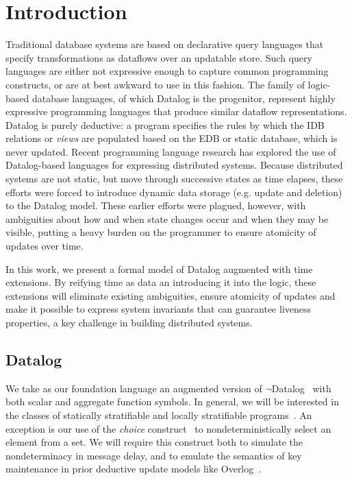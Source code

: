 \section{Introduction}

Traditional database systems are based on declarative query languages that specify transformations as dataflows over an updatable store.
Such query languages are either not expressive enough to capture common programming constructs, or are at best awkward to
use in this fashion.  The family of logic-based database languages, of which Datalog is the progenitor, represent highly
expressive programming languages that produce similar dataflow representations.  Datalog is purely deductive: a program specifies the rules
by which the IDB relations or \emph{views} are populated based on the EDB or static database, which is never updated.
Recent programming language research has explored the use of Datalog-based languages for expressing distributed systems.  Because distributed
systems are not static, but move through successive states as time elapses, these efforts were forced to introduce dynamic data storage (e.g. update and
deletion) to the Datalog model.  These earlier efforts were plagued, however, with ambiguities about how and when state changes occur and when 
they may be visible, putting a heavy burden on the programmer to ensure atomicity of updates over time.

In this work, we present a formal model of Datalog augmented with time extensions.  By reifying time as data an introducing it into the logic, these 
extensions will eliminate existing ambiguities, ensure atomicity of updates and make it possible to express system invariants that 
can guarantee liveness properties, a key challenge in building distributed systems.


\subsection{Datalog}

We take as our foundation language an augmented version of $\lnot$Datalog~\cite{ullmanbook} with both scalar and aggregate function symbols.  
In general, we will be interested in the classes of statically stratifiable and locally stratifiable programs~\cite{prz}.
An exception is our use of the \emph{choice} construct~\cite{greedychoice, eventchoice} to nondeterministically select an element from a set.
We will require this construct both to simulate the nondeterminacy in message delay, and to emulate the semantics of key maintenance in 
prior deductive update models like Overlog~\cite{boon}.
